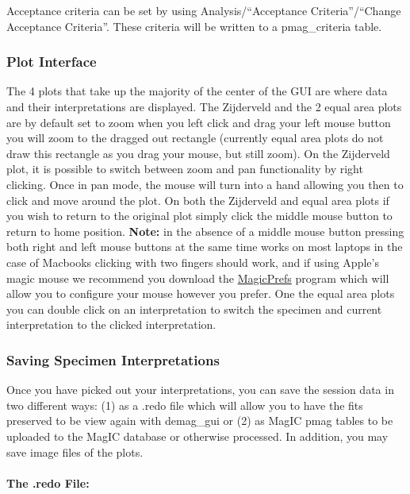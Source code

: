 Acceptance criteria can be set by using Analysis/``Acceptance
Criteria''/``Change Acceptance Criteria''. These criteria will be
written to a pmag\_criteria table.

\subsubsection{Plot Interface}\label{plot-interface}

The 4 plots that take up the majority of the center of the GUI are where
data and their interpretations are displayed. The Zijderveld and the 2
equal area plots are by default set to zoom when you left click and drag
your left mouse button you will zoom to the dragged out rectangle
(currently equal area plots do not draw this rectangle as you drag your
mouse, but still zoom). On the Zijderveld plot, it is possible to switch
between zoom and pan functionality by right clicking. Once in pan mode,
the mouse will turn into a hand allowing you then to click and move
around the plot. On both the Zijderveld and equal area plots if you wish
to return to the original plot simply click the middle mouse button to
return to home position. \textbf{Note:} in the absence of a middle mouse
button pressing both right and left mouse buttons at the same time works
on most laptops in the case of Macbooks clicking with two fingers should
work, and if using Apple's magic mouse we recommend you download the
\href{http://magicprefs.com/}{MagicPrefs} program which will allow you
to configure your mouse however you prefer. One the equal area plots you
can double click on an interpretation to switch the specimen and current
interpretation to the clicked interpretation.

\subsubsection{Saving Specimen
Interpretations}\label{saving-specimen-interpretations}

Once you have picked out your interpretations, you can save the session
data in two different ways: (1) as a .redo file which will allow you to
have the fits preserved to be view again with demag\_gui or (2) as MagIC
pmag tables to be uploaded to the MagIC database or otherwise processed.
In addition, you may save image files of the plots.

\paragraph{The .redo File:}\label{the-.redo-file}

